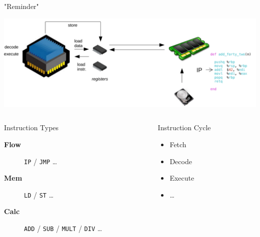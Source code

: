 \documentclass[presentation]{beamer}
\begin{document}
\begin{frame}[fragile,label={sec:org7246555}]{"Reminder"}
 \begin{center}
\includegraphics[width=.8\textwidth]{./images/cpu.png}
\end{center}
\pause
\begin{columns}
\begin{column}{.70\columnwidth}
\begin{block}{Instruction Types}
\begin{description}
\item[{\bf \black Flow}] \texttt{IP} / \texttt{JMP} \ldots{} \hfill
\item[{\bf \black Mem}] \texttt{LD} / \texttt{ST} \ldots{}  \hfill
\item[{\bf \black Calc}] \texttt{ADD} / \texttt{SUB} / \texttt{MULT} / \texttt{DIV} \ldots{} \hfill
\pause
\end{description}
\end{block}
\end{column}
\begin{column}{.29\columnwidth}
\begin{block}{Instruction Cycle}
\begin{itemize}
\item \small Fetch
\item \small Decode
\item \small Execute
\item \small \ldots{}
\end{itemize}
\end{block}
\end{column}
\end{columns}
\end{frame}
\end{document}
